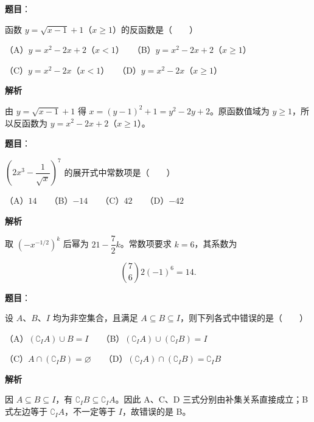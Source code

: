 \begin{answer}

\textbf{题目}：

函数 $y=\sqrt{x-1}+1$（$x\geqslant1$）的反函数是\mbox{（　　）}

（A）$y=x^2-2x+2$（$x<1$）　　（B）$y=x^2-2x+2$（$x\geqslant1$）

（C）$y=x^2-2x$（$x<1$）　　（D）$y=x^2-2x$（$x\geqslant1$）

\textbf{解析}

由 $y=\sqrt{x-1}+1$ 得 $x=(y-1)^2+1=y^2-2y+2$。原函数值域为 $y\geqslant1$，所以反函数为 $y=x^2-2x+2$（$x\geqslant1$）。


\end{answer}
\begin{answer}

\textbf{题目}：

$\left(2x^3-\dfrac1{\sqrt{x}}\right)^7$ 的展开式中常数项是\mbox{（　　）}

（A）$14$　　（B）$-14$　　（C）$42$　　（D）$-42$

\textbf{解析}

取 $\left(-x^{-1/2}\right)^k$ 后幂为 $21-\dfrac72k$。常数项要求 $k=6$，其系数为

\nopagebreak[4]
\[
\binom76 2(-1)^6=14.
\]


\end{answer}
\begin{answer}

\textbf{题目}：

设 $A\text{、}B\text{、}I$ 均为非空集合，且满足 $A\subseteq B\subseteq I$，则下列各式中错误的是\mbox{（　　）}

（A）$(\complement_I A)\cup B=I$　　（B）$(\complement_I A)\cup(\complement_I B)=I$

（C）$A\cap(\complement_I B)=\varnothing$　　（D）$(\complement_I A)\cap(\complement_I B)=\complement_I B$

\textbf{解析}

因 $A\subseteq B\subseteq I$，有 $\complement_I B\subseteq\complement_I A$。因此 A、C、D 三式分别由补集关系直接成立；B 式左边等于 $\complement_I A$，不一定等于 $I$，故错误的是 B。


\end{answer}
